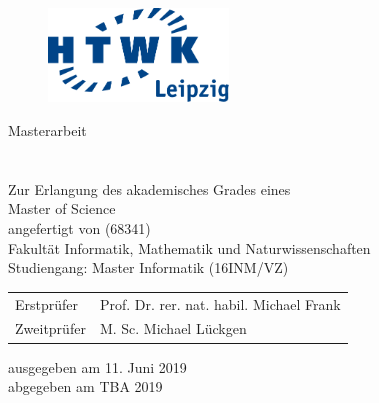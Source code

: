 \makeatletter
\begin{titlepage}
  \vspace{1cm}

  \begin{figure}[h!]
    \centering
    \includegraphics[height=2.5cm]{src/Title/logo_htwk.pdf}
  \end{figure}

  \begin{center}
    \vspace{1cm}

    \begin{onehalfspacing}
      {\Large Masterarbeit} \\[8ex]
      {\huge\textbf{\@title}} \\[5ex]
      {\Large\libertineSB\@subtitle} \\[8ex]
      \large
      Zur Erlangung des akademisches Grades eines \\
      Master of Science \\[5ex]
      \vfill
      {\libertineSB angefertigt von \@author{ }(68341)}\\[5ex]
      \vfill
      Fakultät Informatik, Mathematik und Naturwissenschaften\\
      Studiengang: Master Informatik (16INM/VZ)\\[5ex]
      \vfill
      \begin{tabular}{ll}
        Erstprüfer & Prof. Dr. rer. nat. habil. Michael Frank \\
        Zweitprüfer & M. Sc. Michael Lückgen \\
      \end{tabular}
      \vspace{5ex}
      \vfill
      ausgegeben am 11. Juni 2019 \\
      abgegeben am TBA 2019
    \end{onehalfspacing}
  \end{center}
\end{titlepage}
\makeatother

